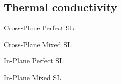 \documentclass{beamer}
\begin{document}

\subsection{Thermal conductivity}
\begin{frame}{Cross-Plane Perfect SL}
\begin{figure}[t]
\begin{center}
\vspace*{-0.8cm}
\renewcommand{\figure}{Fig.}
\label{fig:cp}
\end{center}
\end{figure}
\end{frame}

\begin{frame}{Cross-Plane Mixed SL}
\begin{figure}[t]
\begin{center}
\vspace*{-0.8cm}
\renewcommand{\figure}{Fig.}
\label{fig:cp_all}
\end{center}
\end{figure}
\end{frame}

\begin{frame}{In-Plane Perfect SL}
\begin{figure}[t]
\begin{center}
\vspace*{-0.8cm}
\renewcommand{\figure}{Fig.}
\label{fig:ip}
\end{center}
\end{figure}
\end{frame}

\begin{frame}{In-Plane Mixed SL}
\begin{figure}[t]
\begin{center}
\vspace*{-0.8cm}
\renewcommand{\figure}{Fig.}
\label{fig:ip_all}
\end{center}
\end{figure}
\end{frame}
\end{document}
